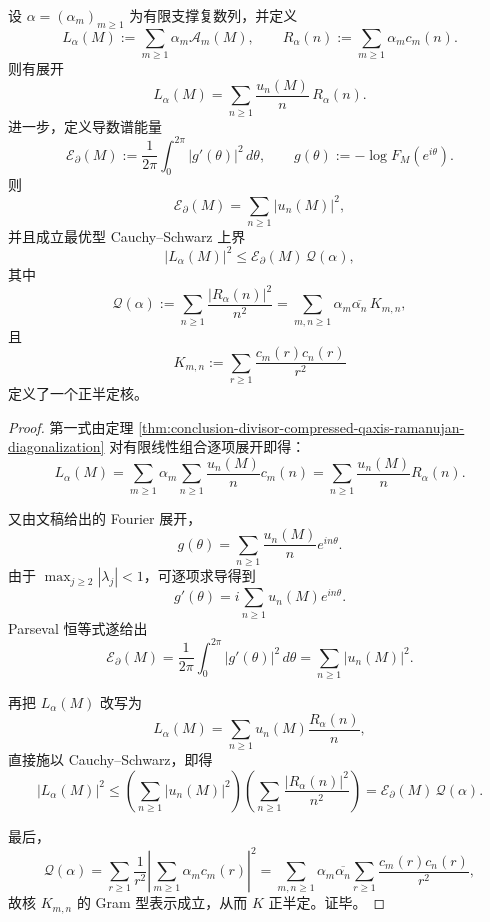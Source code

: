\begin{theorem}\label{thm:conclusion-ramanujan-kernel-psd-derivative-parseval-control}
设 \(\alpha=(\alpha_m)_{m\ge 1}\) 为有限支撑复数列，并定义
\[
L_\alpha(M):=\sum_{m\ge 1}\alpha_m \mathcal A_m(M),
\qquad
R_\alpha(n):=\sum_{m\ge 1}\alpha_m c_m(n).
\]
则有展开
\[
L_\alpha(M)=\sum_{n\ge 1}\frac{u_n(M)}{n}\,R_\alpha(n).
\]
进一步，定义导数谱能量
\[
\mathcal E_{\partial}(M):=\frac{1}{2\pi}\int_0^{2\pi}|g'(\theta)|^2\,d\theta,
\qquad
g(\theta):=-\log F_M(e^{i\theta}).
\]
则
\[
\mathcal E_{\partial}(M)=\sum_{n\ge 1}|u_n(M)|^2,
\]
并且成立最优型 Cauchy--Schwarz 上界
\[
|L_\alpha(M)|^2\le \mathcal E_{\partial}(M)\,\mathcal Q(\alpha),
\]
其中
\[
\mathcal Q(\alpha):=\sum_{n\ge 1}\frac{|R_\alpha(n)|^2}{n^2}
=\sum_{m,n\ge 1}\alpha_m\overline{\alpha_n}\,K_{m,n},
\]
且
\[
K_{m,n}:=\sum_{r\ge 1}\frac{c_m(r)c_n(r)}{r^2}
\]
定义了一个正半定核。
\end{theorem}
\begin{proof}
第一式由定理 \ref{thm:conclusion-divisor-compressed-qaxis-ramanujan-diagonalization} 对有限线性组合逐项展开即得：
\[
L_\alpha(M)
=\sum_{m\ge 1}\alpha_m\sum_{n\ge 1}\frac{u_n(M)}{n}c_m(n)
=\sum_{n\ge 1}\frac{u_n(M)}{n}R_\alpha(n).
\]

又由文稿给出的 Fourier 展开，
\[
g(\theta)=\sum_{n\ge 1}\frac{u_n(M)}{n}e^{in\theta}.
\]
由于 \(\max_{j\ge 2}|\lambda_j|<1\)，可逐项求导得到
\[
g'(\theta)=i\sum_{n\ge 1}u_n(M)e^{in\theta}.
\]
Parseval 恒等式遂给出
\[
\mathcal E_{\partial}(M)
=\frac{1}{2\pi}\int_0^{2\pi}|g'(\theta)|^2\,d\theta
=\sum_{n\ge 1}|u_n(M)|^2.
\]

再把 \(L_\alpha(M)\) 改写为
\[
L_\alpha(M)=\sum_{n\ge 1}u_n(M)\frac{R_\alpha(n)}{n},
\]
直接施以 Cauchy--Schwarz，即得
\[
|L_\alpha(M)|^2
\le
\left(\sum_{n\ge 1}|u_n(M)|^2\right)
\left(\sum_{n\ge 1}\frac{|R_\alpha(n)|^2}{n^2}\right)
=\mathcal E_{\partial}(M)\,\mathcal Q(\alpha).
\]

最后，
\[
\mathcal Q(\alpha)
=\sum_{r\ge 1}\frac{1}{r^2}\left|\sum_{m\ge 1}\alpha_m c_m(r)\right|^2
=\sum_{m,n\ge 1}\alpha_m\overline{\alpha_n}\sum_{r\ge 1}\frac{c_m(r)c_n(r)}{r^2},
\]
故核 \(K_{m,n}\) 的 Gram 型表示成立，从而 \(K\) 正半定。证毕。
\end{proof}

